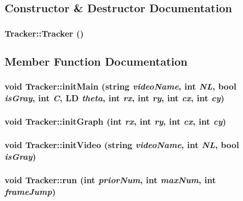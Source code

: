 \subsection{Constructor \& Destructor Documentation}
\subsubsection{\setlength{\rightskip}{0pt plus 5cm}Tracker::Tracker ()}\label{classTracker_6ac188cc1a7bc78c9c23fa35cfa2742d}




\subsection{Member Function Documentation}
\subsubsection{\setlength{\rightskip}{0pt plus 5cm}void Tracker::initMain (string {\em videoName}, int {\em NL}, bool {\em isGray}, int {\em C}, {\bf LD} {\em theta}, int {\em rx}, int {\em ry}, int {\em cx}, int {\em cy})}\label{classTracker_91e80d80282f05cfd44b4afbf930d115}


\subsubsection{\setlength{\rightskip}{0pt plus 5cm}void Tracker::initGraph (int {\em rx}, int {\em ry}, int {\em cx}, int {\em cy})}\label{classTracker_091a2a46637eefac94dc2ce2ce01055a}


\subsubsection{\setlength{\rightskip}{0pt plus 5cm}void Tracker::initVideo (string {\em videoName}, int {\em NL}, bool {\em isGray})}\label{classTracker_fed96a3c5ef6f91e1a7414044fb32ccd}


\subsubsection{\setlength{\rightskip}{0pt plus 5cm}void Tracker::run (int {\em priorNum}, int {\em maxNum}, int {\em frameJump})}\label{classTracker_c14d6b9659cf4d843d38ac013a33c6ba}


